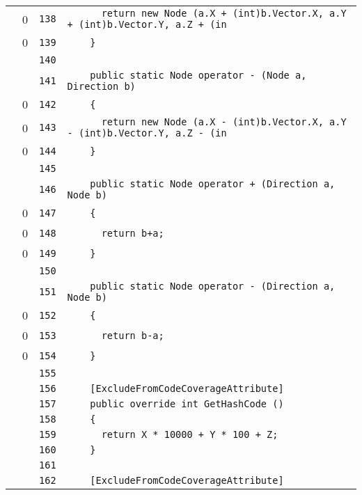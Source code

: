 \documentclass[a4paper,10pt]{article}
\begin{document}
\begin{longtable}[l]{lrrl}
\cellcolor{red} & 0 & \verb~138~ & \verb~      return new Node (a.X + (int)b.Vector.X, a.Y + (int)b.Vector.Y, a.Z + (in~\\
\cellcolor{red} & 0 & \verb~139~ & \verb~    }~\\
\cellcolor{gray} &  & \verb~140~ & \verb~~\\
\cellcolor{gray} &  & \verb~141~ & \verb~    public static Node operator - (Node a, Direction b)~\\
\cellcolor{red} & 0 & \verb~142~ & \verb~    {~\\
\cellcolor{red} & 0 & \verb~143~ & \verb~      return new Node (a.X - (int)b.Vector.X, a.Y - (int)b.Vector.Y, a.Z - (in~\\
\cellcolor{red} & 0 & \verb~144~ & \verb~    }~\\
\cellcolor{gray} &  & \verb~145~ & \verb~~\\
\cellcolor{gray} &  & \verb~146~ & \verb~    public static Node operator + (Direction a, Node b)~\\
\cellcolor{red} & 0 & \verb~147~ & \verb~    {~\\
\cellcolor{red} & 0 & \verb~148~ & \verb~      return b+a;~\\
\cellcolor{red} & 0 & \verb~149~ & \verb~    }~\\
\cellcolor{gray} &  & \verb~150~ & \verb~~\\
\cellcolor{gray} &  & \verb~151~ & \verb~    public static Node operator - (Direction a, Node b)~\\
\cellcolor{red} & 0 & \verb~152~ & \verb~    {~\\
\cellcolor{red} & 0 & \verb~153~ & \verb~      return b-a;~\\
\cellcolor{red} & 0 & \verb~154~ & \verb~    }~\\
\cellcolor{gray} &  & \verb~155~ & \verb~~\\
\cellcolor{gray} &  & \verb~156~ & \verb~    [ExcludeFromCodeCoverageAttribute]~\\
\cellcolor{gray} &  & \verb~157~ & \verb~    public override int GetHashCode ()~\\
\cellcolor{gray} &  & \verb~158~ & \verb~    {~\\
\cellcolor{gray} &  & \verb~159~ & \verb~      return X * 10000 + Y * 100 + Z;~\\
\cellcolor{gray} &  & \verb~160~ & \verb~    }~\\
\cellcolor{gray} &  & \verb~161~ & \verb~~\\
\cellcolor{gray} &  & \verb~162~ & \verb~    [ExcludeFromCodeCoverageAttribute]~\\

\end{longtable}
\end{document}
